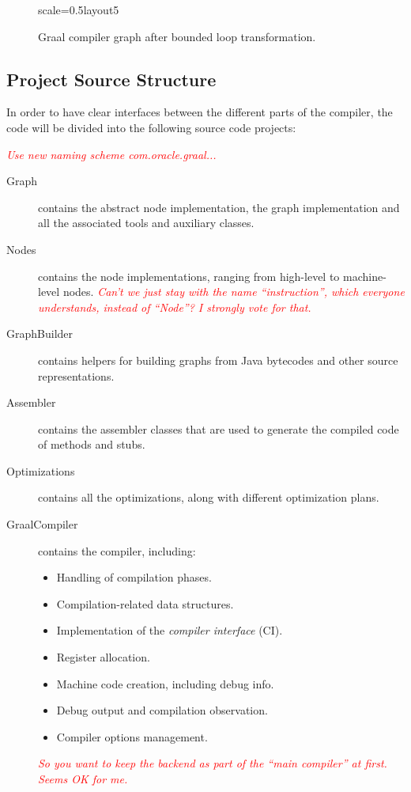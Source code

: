 \documentclass[twocolumn]{svjour3}
\newcommand{\mynote}[2]{
\textcolor{red}{\fbox{\bfseries\sffamily\scriptsize#1}
  {\small\textsf{\emph{#2}}}
\fbox{\bfseries\sffamily\scriptsize }}}
\newcommand\cw[1]{\mynote{CW}{#1}}
\begin{document}
\begin{figure}[h]
  \label{fig:loop5}
  \centering
\begin{digraphenv}{scale=0.5}{layout5}
\end{digraphenv}
  \caption{Graal compiler graph after bounded loop transformation.}
\end{figure}

\subsection{Project Source Structure}
In order to have clear interfaces between the different parts of the compiler, the code will be divided into the following source code projects:
\cw{Use new naming scheme com.oracle.graal...}
\begin{description}
    \item[Graph] contains the abstract node implementation, the graph implementation and all the associated tools and auxiliary classes.
    \item[Nodes] contains the node implementations, ranging from high-level to machine-level nodes. \cw{Can't we just stay with the name ``instruction'', which everyone understands, instead of ``Node''?  I strongly vote for that.}
    \item[GraphBuilder] contains helpers for building graphs from Java bytecodes and other source representations.
    \item[Assembler] contains the assembler classes that are used to generate the compiled code of methods and stubs.
    \item[Optimizations] contains all the optimizations, along with different optimization plans.
    \item[GraalCompiler] contains the compiler, including:
        \begin{itemize}
            \item Handling of compilation phases.
            \item Compilation-related data structures.
            \item Implementation of the \emph{compiler interface} (CI).
            \item Register allocation.
            \item Machine code creation, including debug info.
            \item Debug output and compilation observation.
            \item Compiler options management.
        \end{itemize}
		\cw{So you want to keep the backend as part of the ``main compiler'' at first.  Seems OK for me.}
\end{description}
\end{document}

